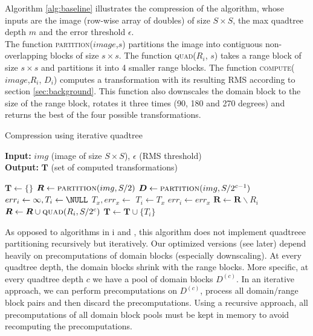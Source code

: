 Algorithm \ref{alg:baseline} illustrates the compression of the algorithm, whose inputs are the image (row-wise array of doubles) of size $S \times S$,
the max quadtree depth $m$ and the error threshold $\epsilon$.\\
The function \textsc{partition($image$,$s$)} partitions the image into contiguous non-overlapping blocks of size $s \times s$.
The function \textsc{quad($R_i$, $s$)} takes a range block of size $s \times s$ and partitions it into 4 smaller range blocks.
The function \textsc{compute($image$,$R_i$, $D_i$)} computes a transformation with its resulting RMS according to section \ref{sec:background}. 
This function also downscales the domain block to the size of the range block, rotates it three times (90, 180 and 270 degrees) 
and returns the best of the four possible transformations.
\begin{algorithm}
\caption{Compression using iterative quadtree}\label{alg:baseline}
\hspace*{\algorithmicindent} \textbf{Input:} $img$ (image of size $S \times S$), $\epsilon$ (RMS threshold) \\
\hspace*{\algorithmicindent} \textbf{Output:} $\boldsymbol{T}$ (set of computed transformations)
\begin{algorithmic}[1]
  \State $\boldsymbol{T} \gets \{\}$  
  \State $\boldsymbol{R} \gets \Call{partition}{img, S/2}$  
     
        \State $\boldsymbol{D} \gets \Call{partition}{img, S/2^{c-1}}$
            \State $err_i \gets \infty, T_i \gets \NULL$
              \State $T_x, err_x \gets $ 
                \State $T_i \gets T_x$
                \State $err_i \gets err_x$
              \EndIf
            \EndFor
        \EndFor
        \State $\boldsymbol{R} \gets \boldsymbol{R} \backslash  R_i$ 
          \State $\boldsymbol{R} \gets \boldsymbol{R} \cup  \Call{quad}{R_i, S/2^c}$
        \Else
          \State $\boldsymbol{T} \gets \boldsymbol{T} \cup \{T_i\}$
        \EndIf
    \EndFor
\end{algorithmic}
\end{algorithm}

As opposed to algorithms in \cite{fisher2012}i and \cite{github-cpp}, this algorithm does not implement quadtreee
partitioning recursively but iteratively.
Our optimized versions (see later) depend heavily on precomputations of domain blocks (especially downscaling).
At every quadtree depth, the domain blocks shrink with the range blocks. More specific, at every quadtree depth $c$ we have a pool of
domain blocks $D^{(c)}$. In an iterative approach, we can perform precomputations on $D^{(c)}$, process all domain/range block pairs 
and then discard the precomputations. Using a recursive approach, all precomputations of all domain block pools must be kept in memory
to avoid recomputing the precomputations.

